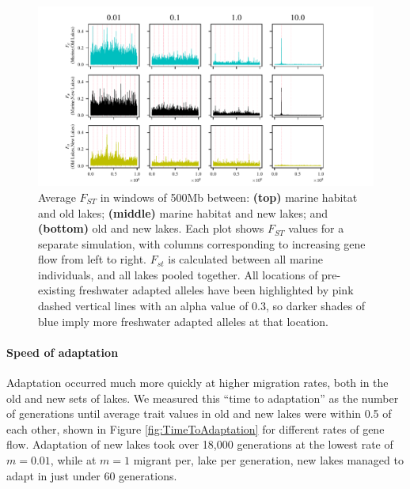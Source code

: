 \documentclass{article}
\begin{document}
\begin{figure}
	\begin{center}
        \includegraphics[width=\textwidth]{Final_Plots/Fst_Genome_faa_pos.pdf}
  		\caption{
		Average $F_{ST}$ in windows of 500Mb between:
        		\textbf{(top)} marine habitat and old lakes;
        		\textbf{(middle)} marine habitat and new lakes; and
        		\textbf{(bottom)} old and new lakes.
        		Each plot shows $F_{ST}$ values for a separate simulation,
        		with columns corresponding to increasing gene flow from left to right.
		$F_{st}$ is calculated between all marine individuals, and all lakes pooled together.
		All locations of pre-existing freshwater adapted alleles have been highlighted by 
		pink dashed vertical lines with an alpha value of 0.3, so darker shades of blue imply more 
		freshwater adapted alleles at that location.
     } \label{fig:Fst}
	\end{center}
\end{figure}

\paragraph*{Speed of adaptation}
Adaptation occurred much more quickly
at higher migration rates,
both in the old and new sets of lakes.
We measured this ``time to adaptation''
as the number of generations until 
average trait values in old and new lakes were within 0.5 of each other,
shown in Figure \ref{fig:TimeToAdaptation} for different rates of gene flow.
Adaptation of new lakes took over 18,000 generations at the lowest rate of $m = 0.01$,
while at $m = 1$ migrant per, lake per generation,
new lakes managed to adapt in just under 60 generations. 
\end{document}
